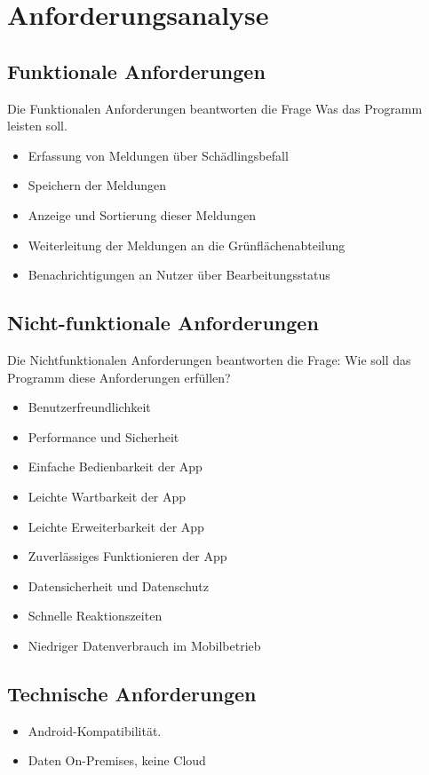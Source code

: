\section{Anforderungsanalyse}

\subsection{Funktionale Anforderungen}

Die Funktionalen Anforderungen beantworten die Frage Was das Programm leisten soll.

\begin{itemize}
  \item Erfassung von Meldungen über Schädlingsbefall
  \item Speichern der Meldungen
  \item Anzeige und Sortierung dieser Meldungen
    \item Weiterleitung der Meldungen an die Grünflächenabteilung
    \item Benachrichtigungen an Nutzer über Bearbeitungsstatus
\end{itemize}

\subsection{Nicht-funktionale Anforderungen}

Die Nichtfunktionalen Anforderungen beantworten die Frage: Wie soll das Programm diese Anforderungen erfüllen?

\begin{itemize}
    \item Benutzerfreundlichkeit
    \item Performance und Sicherheit
  \item  Einfache Bedienbarkeit der App
  \item Leichte Wartbarkeit der App
  \item Leichte Erweiterbarkeit der App
  \item Zuverlässiges Funktionieren der App
  \item Datensicherheit und Datenschutz
  \item Schnelle Reaktionszeiten
  \item Niedriger Datenverbrauch im Mobilbetrieb
\end{itemize}

\subsection{Technische Anforderungen}
\begin{itemize}
    \item Android-Kompatibilität.
    \item Daten On-Premises, keine Cloud
\end{itemize}

